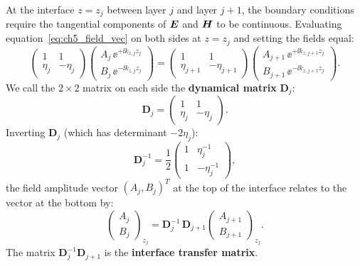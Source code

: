 At the interface $z = z_j$ between layer $j$ and layer $j+1$, the boundary
conditions require the tangential components of $\bm{E}$ and $\bm{H}$ to be
continuous. Evaluating equation~\eqref{eq:ch5_field_vec} on both sides at
$z = z_j$ and setting the fields equal:
\begin{equation}
  \begin{pmatrix} 1 & 1 \\ \eta_j & -\eta_j \end{pmatrix}
  \begin{pmatrix} A_j\,\ee^{+\ii k_{z,j} z_j} \\ B_j\,\ee^{-\ii k_{z,j} z_j} \end{pmatrix}
  =
  \begin{pmatrix} 1 & 1 \\ \eta_{j+1} & -\eta_{j+1} \end{pmatrix}
  \begin{pmatrix} A_{j+1}\,\ee^{+\ii k_{z,j+1} z_j} \\
                  B_{j+1}\,\ee^{-\ii k_{z,j+1} z_j} \end{pmatrix}.
  \label{eq:ch5_bc_raw}
\end{equation}
We call the $2\times 2$ matrix on each side the \textbf{dynamical matrix}
$\bm{D}_j$:
\begin{equation}
  \bm{D}_j = \begin{pmatrix} 1 & 1 \\ \eta_j & -\eta_j \end{pmatrix}.
  \label{eq:ch5_dynamical}
\end{equation}
Inverting $\bm{D}_j$ (which has determinant $-2\eta_j$):
\begin{equation}
  \bm{D}_j^{-1} = \frac{1}{2}
  \begin{pmatrix} 1 & \eta_j^{-1} \\ 1 & -\eta_j^{-1} \end{pmatrix},
  \label{eq:ch5_dinv}
\end{equation}
the field amplitude vector $(A_j, B_j)^T$ at the top of the interface relates
to the vector at the bottom by:
\begin{equation}
  \begin{pmatrix} A_j \\ B_j \end{pmatrix}_{z_j}
  = \bm{D}_j^{-1}\,\bm{D}_{j+1}
  \begin{pmatrix} A_{j+1} \\ B_{j+1} \end{pmatrix}_{z_j}.
  \label{eq:ch5_transfer_interface}
\end{equation}
The matrix $\bm{D}_j^{-1}\bm{D}_{j+1}$ is the \textbf{interface transfer
matrix}.

